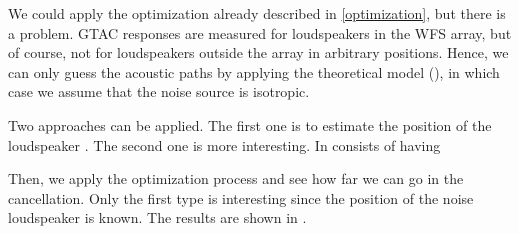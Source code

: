 We could apply the optimization already described in \autoref{optimization}, but there is a problem. GTAC responses are measured for loudspeakers in the WFS array, but of course, not for loudspeakers outside the array in arbitrary positions. Hence, we can only guess the acoustic paths by applying the theoretical model (), in which case we assume that the noise source is isotropic.

Two approaches can be applied. The first one is to estimate the position of the loudspeaker . The second one is more interesting. In consists of having 

Then, we apply the optimization process and see how far we can go in the cancellation. Only the first type is interesting since the position of the noise loudspeaker is known. The results are shown in .



